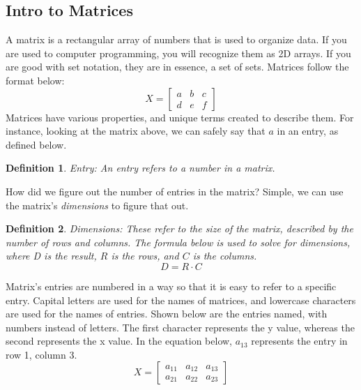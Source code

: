 \documentclass[final,1p,12pt]{elsarticle}
\newtheorem{definition}{Definition}
\begin{document}
    \subsection{Intro to Matrices}
    A matrix is a rectangular array of numbers that is used to organize data.
    If you are used to computer programming, you will recognize them as 2D arrays.
    If you are good with set notation, they are in essence, a set of sets.
    Matrices follow the format below:
    \begin{equation*}
        X =
        \begin{bmatrix}
            a & b & c \\
            d & e & f
        \end{bmatrix}
    \end{equation*}
    Matrices have various properties, and unique terms created to describe them.
    For instance, looking at the matrix above, we can safely say that $a$ in an entry, as defined below.
    \begin{definition}
        Entry: An entry refers to a number in a matrix.
    \end{definition}
    How did we figure out the number of entries in the matrix? Simple, we can use the matrix's \emph{dimensions} to figure that out.
    \begin{definition}Dimensions:
        These refer to the size of the matrix, described by the number of rows and columns.
        The formula below is used to solve for dimensions, where D is the result, $R$ is the rows, and $C$ is the columns.
        \begin{equation*}
                D = R \cdot C
        \end{equation*}
    \end{definition}
    Matrix's entries are numbered in a way so that it is easy to refer to a specific entry.
    Capital letters are used for the names of matrices, and lowercase characters are used for the names of entries.
    Shown below are the entries named, with numbers instead of letters.
    The first character represents the y value, whereas the second represents the x value.
    In the equation below, $a_{13}$ represents the entry in row 1, column 3.
    \begin{equation*}
        X =
        \begin{bmatrix}
            a_{11} & a_{12} & a_{13} \\
            a_{21} & a_{22} & a_{23}
        \end{bmatrix}
    \end{equation*}
        
\end{document}
